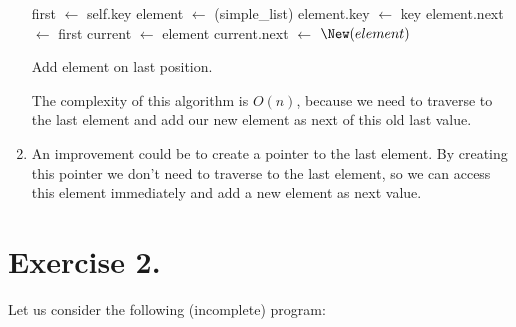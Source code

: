 \documentclass{article}
\begin{document}
\begin{enumerate}
\begin{algorithm}

    first $\leftarrow$ self.key \;
    element $\leftarrow$ \New(simple\_list) \;
    element.key $\leftarrow$ key \;
    element.next $\leftarrow$ first \;
    current $\leftarrow$ element \;
    current.next $\leftarrow$ $\New(element)$


     \caption{Add element on last position.}
\end{algorithm}
\vspace{-0.5cm}
    The complexity of this algorithm is $O(n)$, because we need to traverse to the last element and add our new element as next of this old last value.
    \item An improvement could be to create a pointer to the last element. By creating this pointer we don't need to traverse to the last element, so we can access this element immediately and add a new element as next value.
\end{enumerate}

\section*{Exercise 2.}
Let us consider the following (incomplete) program:
\vspace{0.5cm}
\end{document}
